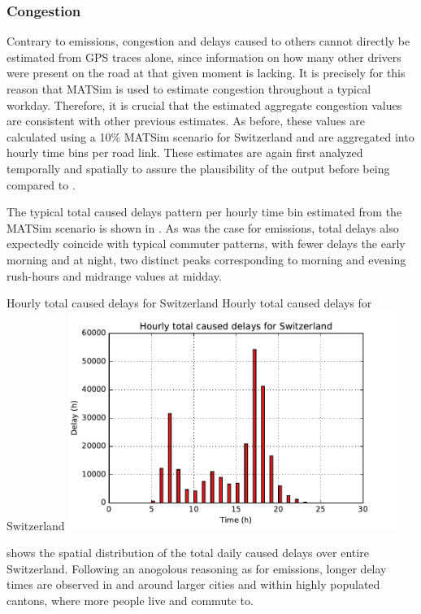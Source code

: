\subsubsection{Congestion}

Contrary to emissions, congestion and delays caused to others cannot directly be estimated from GPS traces alone, since information on how many other drivers were present on the road at that given moment is lacking.
It is precisely for this reason that MATSim is used to estimate congestion throughout a typical workday.
Therefore, it is crucial that the estimated aggregate congestion values are consistent with other previous estimates.
As before, these values are calculated using a 10\% MATSim scenario for Switzerland and are aggregated into hourly time bins per road link.
These estimates are again first analyzed temporally and spatially to assure the plausibility of the output before being compared to \citet{mkinfras2016staukosten}.

The typical total caused delays pattern per hourly time bin estimated from the MATSim scenario is shown in .
As was the case for emissions, total delays also expectedly coincide with typical commuter patterns, with fewer delays the early morning and at night, two distinct peaks corresponding to morning and evening rush-hours and midrange values at midday.

\createfigure%
{Hourly total caused delays for Switzerland}%
{Hourly total caused delays for Switzerland}%
{\label{fig:hourlyDelays}}%
{\includegraphics[width=0.8\textwidth,
angle=0]{figures/hourly_caused_delays.pdf}}%
{}

 shows the spatial distribution of the total daily caused delays over entire Switzerland.
Following an anogolous reasoning as for emissions, longer delay times are observed in and around larger cities and within highly populated cantons, where more people live and commute to.

